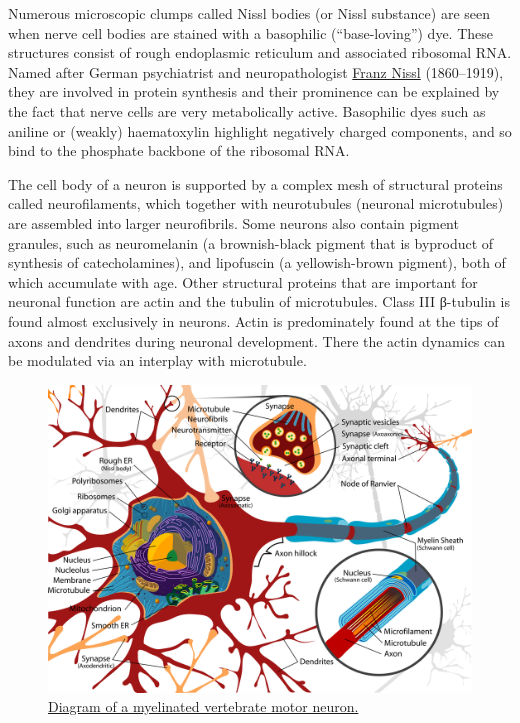 Numerous microscopic clumps called Nissl bodies (or Nissl substance) are seen when nerve cell bodies are stained with a basophilic (``base-loving'') dye. These structures consist of rough endoplasmic reticulum and associated ribosomal RNA. Named after German psychiatrist and neuropathologist \href{https://en.wikipedia.org/wiki/Franz_Nissl}{Franz Nissl} (1860--1919), they are involved in protein synthesis and their prominence can be explained by the fact that nerve cells are very metabolically active. Basophilic dyes such as aniline or (weakly) haematoxylin highlight negatively charged components, and so bind to the phosphate backbone of the ribosomal RNA.

The cell body of a neuron is supported by a complex mesh of structural proteins called neurofilaments, which together with neurotubules (neuronal microtubules) are assembled into larger neurofibrils. Some neurons also contain pigment granules, such as neuromelanin (a brownish-black pigment that is byproduct of synthesis of catecholamines), and lipofuscin (a yellowish-brown pigment), both of which accumulate with age. Other structural proteins that are important for neuronal function are actin and the tubulin of microtubules. Class III β-tubulin is found almost exclusively in neurons. Actin is predominately found at the tips of axons and dendrites during neuronal development. There the actin dynamics can be modulated via an interplay with microtubule.



\begin{figure}

{\centering \includegraphics[width=0.7\linewidth]{./figures/cells/Complete_neuron_cell_diagram_en} 

}

\caption{\href{https://commons.wikimedia.org/wiki/File:Complete_neuron_cell_diagram_en.svg}{Diagram of a myelinated vertebrate motor neuron.}}\label{fig:motorneuron}
\end{figure}

